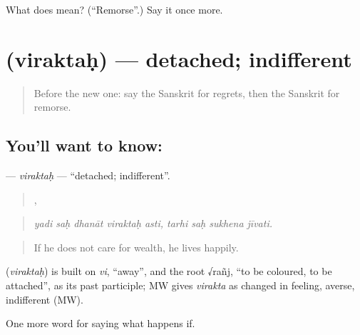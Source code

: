 \begin{tcolorbox}[breakable,colback=teal!4,colframe=teal!35!black,title={Before you move on}]
What does  mean? (\textquotedblleft{}Remorse\textquotedblright{}.) Say it once more.
\end{tcolorbox}
\section[\texorpdfstring{\sk{विरक्तः} (viraktaḥ)}{विरक्तः (viraktaḥ)}]{ (viraktaḥ) — detached; indifferent}

\label{lesson:SA-C551-viraktah}



\begin{quote}
Before the new one: say the Sanskrit for regrets, then the Sanskrit for remorse.
\end{quote}

\subsection*{You'll want to know: }
\textbf{} — \emph{viraktaḥ} — \textquotedblleft{}detached; indifferent\textquotedblright{}.

\begin{quote}
    ,    
\end{quote}

\begin{quote}
\emph{yadi saḥ dhanāt viraktaḥ asti, tarhi saḥ sukhena jīvati.}
\end{quote}

\begin{quote}
If he does not care for wealth, he lives happily.
\end{quote}

\begin{cousinweb}
\textbf{} (\emph{viraktaḥ}) is built on \emph{vi}, \textquotedblleft{}away\textquotedblright{}, and the root √rañj, \textquotedblleft{}to be coloured, to be attached\textquotedblright{}, as its past participle; MW gives \emph{virakta} as changed in feeling, averse, indifferent (MW).
\end{cousinweb}

\begin{grammarlens}[title={What you've built}]
One more word for saying what happens if.
\end{grammarlens}

